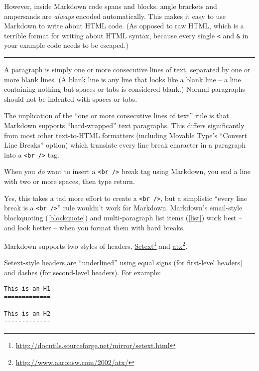 However, inside Markdown code spans and blocks, angle brackets and
ampersands are \emph{always} encoded automatically. This makes it easy to use
Markdown to write about HTML code. (As opposed to raw HTML, which is a
terrible format for writing about HTML syntax, because every single \texttt{<}
and \texttt{\&} in your example code needs to be escaped.)

\begin{center}\rule{3in}{0.4pt}\end{center}

A paragraph is simply one or more consecutive lines of text, separated
by one or more blank lines. (A blank line is any line that looks like a
blank line -- a line containing nothing but spaces or tabs is considered
blank.) Normal paragraphs should not be indented with spaces or tabs.

The implication of the ``one or more consecutive lines of text'' rule is
that Markdown supports ``hard-wrapped'' text paragraphs. This differs
significantly from most other text-to-HTML formatters (including Movable
Type's ``Convert Line Breaks'' option) which translate every line break
character in a paragraph into a \texttt{<br \slash >} tag.

When you \emph{do} want to insert a \texttt{<br \slash >} break tag using Markdown, you
end a line with two or more spaces, then type return.

Yes, this takes a tad more effort to create a \texttt{<br \slash >}, but a simplistic
``every line break is a \texttt{<br \slash >}'' rule wouldn't work for Markdown.
Markdown's email-style blockquoting (\autoref{blockquote}) and multi-paragraph list items (\autoref{list})
work best -- and look better -- when you format them with hard breaks.

Markdown supports two styles of headers, \href{http://docutils.sourceforge.net/mirror/setext.html}{Setext}\footnote{\href{http://docutils.sourceforge.net/mirror/setext.html}{http:\slash \slash docutils.sourceforge.net\slash mirror\slash setext.html}} and \href{http://www.aaronsw.com/2002/atx/}{atx}\footnote{\href{http://www.aaronsw.com/2002/atx/}{http:\slash \slash www.aaronsw.com\slash 2002\slash atx\slash }}.

Setext-style headers are ``underlined'' using equal signs (for first-level
headers) and dashes (for second-level headers). For example:

\begin{verbatim}
This is an H1
=============

This is an H2
-------------
\end{verbatim}

